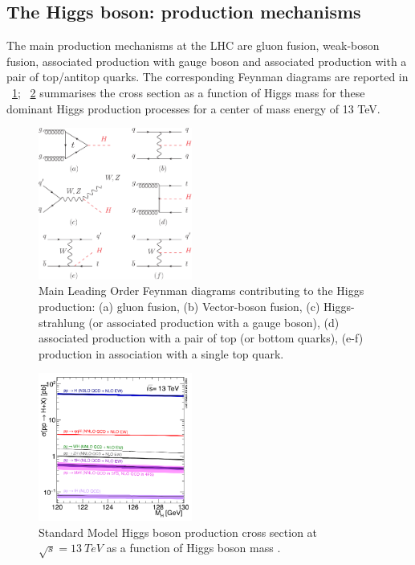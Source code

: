 \subsection{The Higgs boson: production mechanisms}
The main production mechanisms at the LHC are gluon fusion, weak-boson fusion, associated production with gauge boson and associated production with a pair of top/antitop quarks. 
The corresponding Feynman diagrams are reported in \figurename~\ref{Feynman_H_production}; \figurename~\ref{plot_13tev_H_production} summarises the cross section as a function of Higgs mass for these dominant Higgs production processes for a center of mass energy of 13 TeV. 

\begin{figure}[htbp]
\centering
\includegraphics[width=0.45\textwidth]{Images/Feynman_H_production}
\caption{Main Leading Order Feynman diagrams contributing to the Higgs production: (a) gluon fusion, (b) Vector-boson fusion, (c) Higgs-strahlung (or associated production with a gauge boson), (d) associated production with a pair of top (or bottom quarks), (e-f) production in association with a single top quark.}
\label{Feynman_H_production}
\end{figure}
\begin{figure}[htbp]
\centering
\includegraphics[width=0.45\textwidth]{Images/plot_13tev_H_production}
\caption{Standard Model Higgs boson production cross section at $\sqrt{s} = 13\ TeV$ as a function of Higgs boson mass \cite{HiggsTWiki}.}
\label{plot_13tev_H_production}
\end{figure}

